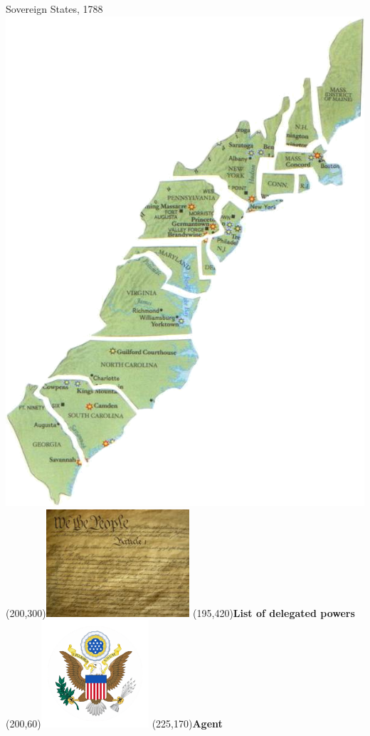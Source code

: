 \begin{frame}{Sovereign States, 1788}
    \includegraphics[height=0.75\textheight]{img/colonies.png} \\
    \pause
    \Put(200,300){\includegraphics[width=0.4\textwidth]{img/constitution.png}}
    \Put(195,420){\textbf{List of delegated powers}}
    \pause
    \Put(200,60){\includegraphics[width=0.3\textwidth]{img/national-seal.png}}
    \Put(225,170){\textbf{\Large{Agent}}}
\end{frame}

